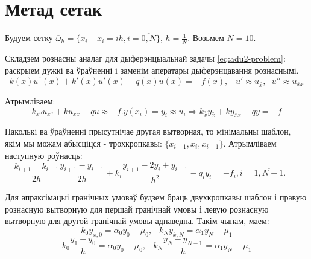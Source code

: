 \section{Метад сетак}

Будуем сетку $\overline{\omega } _h = \{ x_i| \hspace{10pt} x_i = ih, i = \overline{0,N} \} $, $h = \frac{1}{N}$. Возьмем $N=10$.\par

Складзем рознасны аналаг для дыферэнцыальнай задачы \eqref{eq:adu2-problem}: раскрыем дужкі ва ўраўненні і заменім аператары дыферэнцавання рознаснымі.
\begin{equation}
    k(x)u^{''}(x) + k{'}(x)u{'}(x) - q(x)u(x) = -f(x), \hspace{10pt} u{'} \approx u_{\overset{\circ}{x}}, \hspace{7pt} u{''} \approx u_{\overline{x} x}
\end{equation}

Атрымліваем:
\begin{equation}
    k_{x^{o}}u_{x^{o}} + k u_{\overline{x} x} -qu \approx -f. y(x_i) = y_i \approx u_i \Rightarrow k_{\overset{\circ}{x}}y_{\overset{\circ}{x}} + k y_{\overline{x} x} -qy = -f
\end{equation}

Паколькі ва ўраўненні прысутнічае другая вытворная, то мінімальны шаблон, якім мы можам абысціцся - трохкропкавы: $\{ x_{i-1}, x_i, x_{i+1} \} $. Атрымліваем наступную роўнасць:
\begin{equation} \label{eq:grids1}
    \frac{k_{i+1} - k_{i-1}}{2h} \frac{y_{i+1} - y_{i-1}}{2h} + k_i \frac{y_{i+1} - 2y_i + y_{i-1}}{h^{2}} - q_i y_i = - f_i, i = \overline{1, N-1}. \hspace{20pt}
\end{equation}

Для апраксімацыі гранічных умоваў будзем браць двухкропкавы шаблон і правую рознасную вытворную для першай гранічнай умовы і левую рознасную вытворную для другой гранічнай умовы адпаведна. Такім чынам, маем:
\[
    k_0 y_{x,0} = \alpha _0 y_0 - \mu _0, -k_N y_{\overline{x} , N} = \alpha _1 y_N - \mu _1
\]
\[
    k_0 \frac{y_1 - y_0}{h} = \alpha _0 y_0 - \mu _0, -k_N \frac{y_N - y_{N-1}}{h} = \alpha _1 y_N - \mu _1
\]

